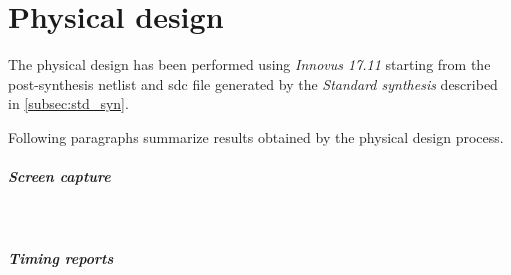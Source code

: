 \chapter{Physical design}
\label{chap:physical_design}
The physical design has been performed using \textit{Innovus 17.11} starting
from the post-synthesis netlist and sdc file generated by the \textit{Standard
synthesis} described in \ref{subsec:std_syn}.

\bigskip
Following paragraphs summarize results obtained by the physical design process.

\paragraph{Screen capture} \mbox{} \\

\paragraph{Timing reports} \mbox{} \\


